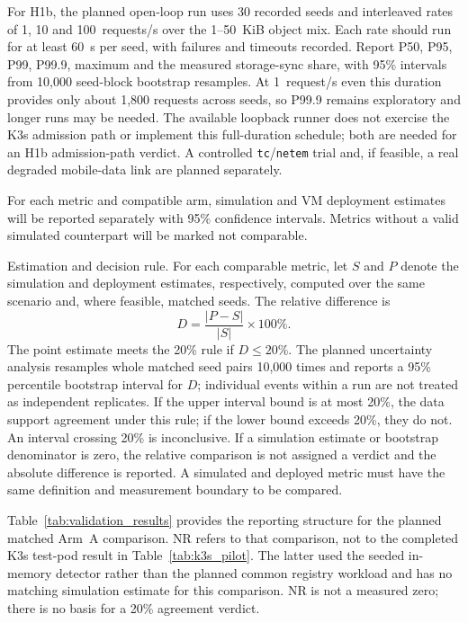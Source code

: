 \documentclass{ieeeaccess}
\renewcommand{\textbf}[1]{#1}
\begin{document}
For H1b, the planned open-loop run uses 30 recorded seeds and interleaved rates of 1, 10 and 100~requests/s over the 1--50~KiB object mix. Each rate should run for at least 60~s per seed, with failures and timeouts recorded. Report P50, P95, P99, P99.9, maximum and the measured storage-sync share, with 95\% intervals from 10,000 seed-block bootstrap resamples. At 1~request/s even this duration provides only about 1,800 requests across seeds, so P99.9 remains exploratory and longer runs may be needed. The available loopback runner does not exercise the K3s admission path or implement this full-duration schedule; both are needed for an H1b admission-path verdict. A controlled \texttt{tc}/\texttt{netem} trial and, if feasible, a real degraded mobile-data link are planned separately.

For each metric and compatible arm, simulation and VM deployment estimates will be reported separately with 95\% confidence intervals. Metrics without a valid simulated counterpart will be marked not comparable.

\noindent\textbf{Estimation and decision rule.} For each comparable metric, let $S$ and $P$ denote the simulation and deployment estimates, respectively, computed over the same scenario and, where feasible, matched seeds. The relative difference is
\begin{equation}
D = \frac{|P-S|}{|S|}\times 100\%.
\label{eq:production_gap}
\end{equation}
The point estimate meets the 20\% rule if $D\leq20\%$. The planned uncertainty analysis resamples whole matched seed pairs 10,000 times and reports a 95\% percentile bootstrap interval for $D$; individual events within a run are not treated as independent replicates. If the upper interval bound is at most 20\%, the data support agreement under this rule; if the lower bound exceeds 20\%, they do not. An interval crossing 20\% is inconclusive. If a simulation estimate or bootstrap denominator is zero, the relative comparison is not assigned a verdict and the absolute difference is reported. A simulated and deployed metric must have the same definition and measurement boundary to be compared.

Table~\ref{tab:validation_results} provides the reporting structure for the planned matched Arm~A comparison. NR refers to that comparison, not to the completed K3s test-pod result in Table~\ref{tab:k3s_pilot}. The latter used the seeded in-memory detector rather than the planned common registry workload and has no matching simulation estimate for this comparison. NR is not a measured zero; there is no basis for a 20\% agreement verdict.
\end{document}
